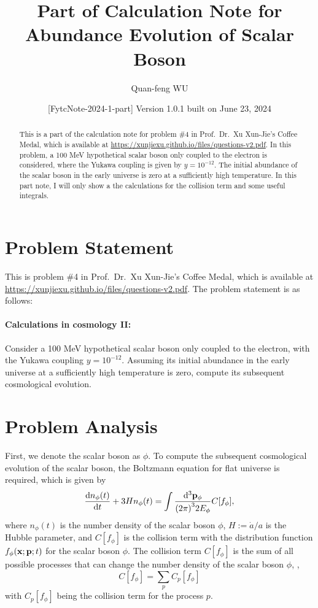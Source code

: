 \documentclass{article}
\title{Part of Calculation Note for Abundance Evolution of Scalar Boson}
\author[a]{Quan-feng WU\email{wuquanfeng@ihep.ac.cn}}
\affil[a]{Institute of High Energy Physics, Chinese Academy of Sciences, Beijing 100049, China}
\affil[b]{University of Chinese Academy of Sciences, Beijing 100049, China}
\date{[FytcNote-2024-1-part] Version 1.0.1 built on June 23, 2024\license}
\begin{document}
    \maketitle

    \begin{abstract}
        This is a part of the calculation note for problem \#4 in Prof.~Dr.~Xu Xun-Jie's Coffee Medal, which is available at \url{https://xunjiexu.github.io/files/questions-v2.pdf}.
        In this problem, a 100 MeV hypothetical scalar boson only coupled to the electron is considered, where the Yukawa coupling is given by $y = 10^{-12}$.
        The initial abundance of the scalar boson in the early universe is zero at a sufficiently high temperature.
        In this part note, I will only show a the calculations for the collision term and some useful integrals.
    \end{abstract}

    \tableofcontents
    \newpage

    \section{Problem Statement}
        This is problem \#4 in Prof.~Dr.~Xu Xun-Jie's Coffee Medal, which is available at \url{https://xunjiexu.github.io/files/questions-v2.pdf}.
        The problem statement is as follows:

        \paragraph{Calculations in cosmology II:}
        Consider a 100 MeV hypothetical scalar boson only coupled to the electron, with the Yukawa coupling $y = 10^{-12}$. Assuming its initial abundance in the early universe at a sufficiently high temperature is zero, compute its subsequent cosmological evolution.

    \section{Problem Analysis}
        First, we denote the scalar boson as $\phi$.
        To compute the subsequent cosmological evolution of the scalar boson, the Boltzmann equation for flat universe is required, which is given by \cite{Dodelson:2020MC}
        \begin{equation}
            \dv{n_\phi(t)}{t} + 3 H n_\phi(t) = \int \frac{\dd[3]{\vb{p}_\phi}}{\qty(2 \pi)^3 2 E_\phi} C[f_\phi],
            \label{eq:Boltzmann-equation}
        \end{equation}
        where $n_\phi(t)$ is the number density of the scalar boson $\phi$, $H := \dot{a} / a$ is the Hubble parameter, and $C[f_\phi]$ is the collision term with the distribution function $f_\phi(\vb{x}; \vb{p}; t)$ for the scalar boson $\phi$.
        The collision term $C[f_\phi]$ is the sum of all possible processes that can change the number density of the scalar boson $\phi$, \ie,
        \begin{equation}
            C[f_\phi] = \sum_p C_p[f_\phi]
        \end{equation}
        with $C_p[f_\phi]$ being the collision term for the process $p$.
\end{document}
